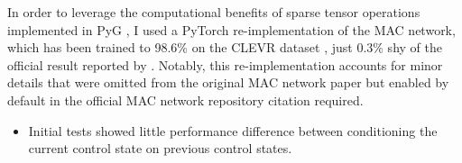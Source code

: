 In order to leverage the computational benefits of sparse tensor operations implemented in PyG \cite{fey2019fast}, I used a PyTorch \cite{paszke2019pytorch} re-implementation of the MAC network, which has been trained to 98.6\% on the CLEVR dataset \cite{eyzaguirre2020differentiable}, just 0.3\% shy of the official result reported by 
\citeauthor{hudson2018compositional}. Notably, this re-implementation accounts for minor details that were omitted from the original MAC network paper but enabled by default in the official MAC network repository {\color{red} citation required}.

\begin{itemize}
  \item Initial tests showed little performance difference between conditioning the current control state on previous control states. %
\end{itemize}

